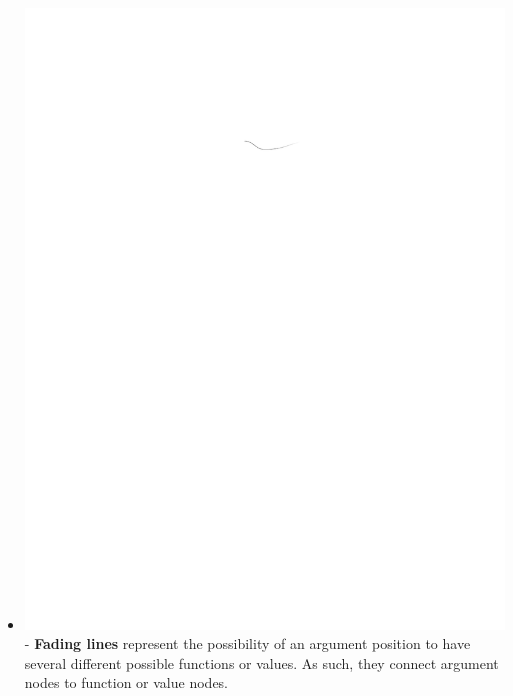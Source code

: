 \documentclass[conference]{IEEEtran}
\begin{document}
\begin{itemize}
		\item  \vspace{.25cm} \includegraphics{glossary-fadingline} - \textbf{Fading
			lines} represent the possibility of an argument position to have several
		different possible functions or values. As such, they connect argument nodes
		to function or value nodes.
		

\end{itemize}
\end{document}
